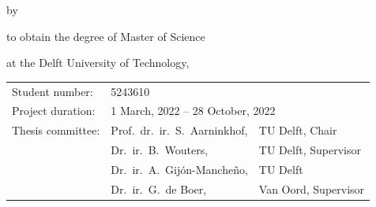 \begin{titlepage}


    \begin{center}


        {\makeatletter
            \largetitlestyle\fontsize{48}{94}\selectfont\@title
            \makeatother}

        {\makeatletter
            \ifx\@subtitle\undefined\else
                \bigskip
                {\tudsffamily\fontsize{22}{32}\selectfont\@subtitle}
            \fi
            \makeatother}

        \bigskip
        \bigskip

        by

        \bigskip
        \bigskip

        {\makeatletter
            \largetitlestyle\fontsize{26}{26}\selectfont\@author
            \makeatother}

        \bigskip
        \bigskip

        to obtain the degree of Master of Science

        at the Delft University of Technology,


        \vfill
        \begin{tabular}{lll}
            Student number:   & 5243610                                                       \\
            Project duration: & \multicolumn{2}{l}{1 March, 2022 -- 28 October, 2022}                        \\
            Thesis committee: & Prof.\ dr.\ ir.\ S.\ Aarninkhof,       & TU Delft, Chair      \\
                              & Dr.\ ir.\ B.\ Wouters,                 & TU Delft, Supervisor \\
                              & Dr.\ ir.\ A.\ Gijón-Mancheño,          & TU Delft             \\
                              & Dr.\ ir.\ G.\ de Boer,                 & Van Oord, Supervisor
        \end{tabular}


\end{center}
\end{titlepage}
